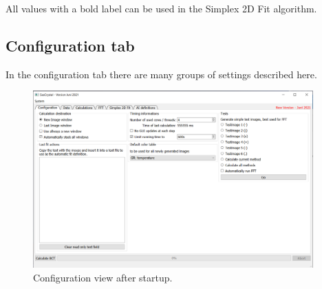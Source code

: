 \documentclass[11pt]{article} %
\begin{document}
All values with a bold label can be used in the Simplex 2D Fit algorithm.

\clearpage
\subsection{Configuration tab}

In the configuration tab there are many groups of settings described here.
\begin{figure}[H]
 \centering
 \includegraphics[width=0.96\textwidth]{main-config-start.png}
 \caption{Configuration view after startup.}
 \label{fig:configstart}
\end{figure}
\end{document}
